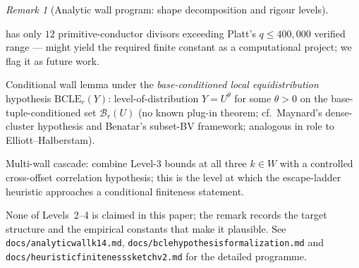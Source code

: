 \documentclass[11pt]{article}
\renewcommand{\_}{\origunderscore\allowbreak}
\theoremstyle{definition}
\theoremstyle{remark}
\newtheorem{remark}[theorem]{Remark}
\begin{document}
\begin{remark}[Analytic wall program: shape decomposition and rigour levels]
\begin{description}
        has only $12$ primitive-conductor divisors exceeding
        Platt's $q\le 400{,}000$ verified range --- might yield the
        required finite constant as a computational project; we
        flag it as future work.
  \item[\textbf{Level 3}] Conditional wall lemma under the
        \emph{base-conditioned local equidistribution} hypothesis
        $\mathrm{BCLE}_{r}(Y)$: level-of-distribution $Y=U^{\theta}$
        for some $\theta>0$ on the base-tuple-conditioned set
        $\mathcal{B}_{r}(U)$ (no known plug-in theorem; cf.\ Maynard's
        dense-cluster hypothesis and Benatar's subset-BV framework;
        analogous in role to Elliott--Halberstam).
  \item[\textbf{Level 4}] Multi-wall cascade: combine Level-3 bounds
        at all three $k\in W$ with a controlled cross-offset
        correlation hypothesis; this is the level at which the
        escape-ladder heuristic approaches a conditional finiteness
        statement.
\end{description}

None of Levels~2--4 is claimed in this paper; the remark records
the target structure and the empirical constants that make it
plausible.  See \texttt{docs/analytic\_wall\_k14.md},
\texttt{docs/bcle\_hypothesis\_formalization.md} and
\texttt{docs/heuristic\_finiteness\_sketch\_v2.md} for the detailed
programme.
\end{remark}
\end{document}
